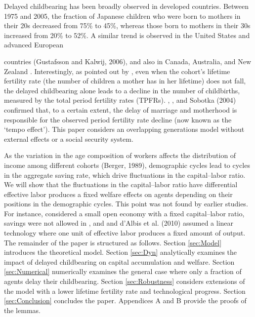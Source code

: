 \documentclass[nogrid]{MBE}%
\begin{document}
Delayed childbearing has been broadly observed in developed countries. Between 1975 and 2005, the
fraction of Japanese children who were born to mothers in their 20s  decreased from 75\% to 45\%,
whereas those born to mothers in their 30s increased from 20\% to 52\%. A similar trend is
observed in the United States and advanced European {countries\vvp{} (Gustafsson and Kalwij,
2006), and also in Canada, Australia, and New Zealand \citet{Hampel:1974}. Interestingly, as
pointed out by \citep{Efron:1979,Felsenstein:1985}, even when the cohort's lifetime fertility rate
(the number of children a mother has in her lifetime) does not fall, the delayed childbearing
alone leads to a decline in the number of childbirths, measured by the total period fertility
rates (TPFRs). \citet{Huber:2004}, \citet{Miller:1974}, and Sobotka (2004) confirmed that, to a
certain extent, the delay of marriage and motherhood is responsible for the observed period
fertility rate decline (now known as the `tempo effect'). This paper considers an overlapping
generations model
without external effects or a social security system. %

As the variation in the age composition of workers affects the distribution of income among
different cohorts (Berger, 1989), demographic cycles lead to cycles in the aggregate saving rate,
which drive fluctuations in the capital--labor ratio. We will show that the fluctuations in the
capital--labor ratio have differential  effective labor produces a fixed welfare effects on agents
depending on their positions in the demographic cycles. This point was not found by earlier
studies. For instance, \citet{Archibald_Roger:2002} considered a small open economy with a fixed
capital--labor ratio, savings were not allowed in \citet{Blouin_Butt_Roger:2005}, and
\citep{Bar-Hen_Kishino:2000} and d'Albis et al. (2010) assumed a linear technology where one unit
of effective labor produces a fixed amount of output. The remainder of the paper is structured as
follows. Section \ref{sec:Model} introduces the theoretical model. Section \ref{sec:Dyn}
analytically examines the impact of delayed childbearing on capital accumulation and welfare.
Section \ref{sec:Numerical} numerically examines the general case where only a fraction of agents
delay their childbearing. Section \ref{sec:Robustness} considers extensions of the model with a
lower lifetime fertility rate and technological progress. Section \ref{sec:Conclusion} concludes
the paper. Appendices A and B provide the proofs of the lemmas.

}
\end{document}
